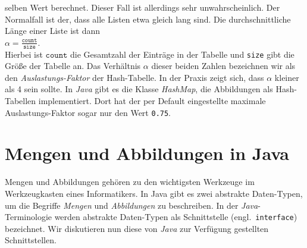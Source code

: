 selben Wert berechnet.  Dieser Fall ist allerdings sehr unwahrscheinlich.  Der Normalfall
ist der, dass alle Listen etwa gleich lang sind.  Die durchschnittliche L\"ange  einer Liste
ist dann \\[0.2cm]
\hspace*{1.3cm} $\alpha = \displaystyle \frac{\mathtt{count}}{\mathtt{size}}$. \\[0.2cm]
Hierbei ist $\mathtt{count}$ die Gesamtzahl der Eintr\"age in der Tabelle und \texttt{size}
gibt die Gr\"o{\ss}e der Tabelle an.  Das Verh\"altnis $\alpha$ dieser beiden Zahlen bezeichnen wir 
als den \emph{Auslastungs-Faktor} der Hash-Tabelle.  In der Praxis zeigt sich, dass
$\alpha$ kleiner als 4 sein sollte.  In \textsl{Java} gibt es die Klasse \textsl{HashMap},
die Abbildungen als Hash-Tabellen implementiert.  Dort hat der per Default eingestellte maximale
Auslastungs-Faktor sogar nur den Wert \texttt{0.75}.

\pagebreak
\section{Mengen und Abbildungen in Java}
Mengen und Abbildungen geh\"oren zu den wichtigsten Werkzeuge im Werkzeugkasten eines
Informatikers.  In Java gibt es zwei abstrakte Daten-Typen, um die Begriffe \emph{Mengen}
und \emph{Abbildungen} zu beschreiben. 
In der \textsl{Java}-Terminologie werden abstrakte Daten-Typen als Schnittstelle
(engl.~\texttt{interface}) bezeichnet.  Wir diskutieren nun diese von \textsl{Java} zur
Verf\"ugung gestellten Schnittstellen.


